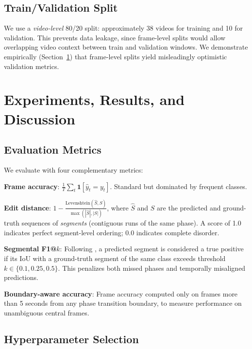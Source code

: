 \documentclass[10pt,twocolumn]{article}
\begin{document}
\subsection{Train/Validation Split}

We use a \emph{video-level} 80/20 split: approximately 38 videos for training and 10 for validation. This prevents data leakage, since frame-level splits would allow overlapping video context between train and validation windows. We demonstrate empirically (Section~\ref{sec:experiments}) that frame-level splits yield misleadingly optimistic validation metrics.

\section{Experiments, Results, and Discussion}
\label{sec:experiments}

\subsection{Evaluation Metrics}

We evaluate with four complementary metrics:

\textbf{Frame accuracy}: $\frac{1}{T}\sum_t \mathbf{1}[\hat{y}_t = y_t]$. Standard but dominated by frequent classes.

\textbf{Edit distance}: $1 - \frac{\text{Levenshtein}(\hat{S}, S)}{\max(|\hat{S}|, |S|)}$, where $\hat{S}$ and $S$ are the predicted and ground-truth sequences of \emph{segments} (contiguous runs of the same phase). A score of 1.0 indicates perfect segment-level ordering; 0.0 indicates complete disorder.

\textbf{Segmental F1@$k$}: Following \cite{farha2019mstcn}, a predicted segment is considered a true positive if its IoU with a ground-truth segment of the same class exceeds threshold $k \in \{0.1, 0.25, 0.5\}$. This penalizes both missed phases and temporally misaligned predictions.

\textbf{Boundary-aware accuracy}: Frame accuracy computed only on frames more than 5 seconds from any phase transition boundary, to measure performance on unambiguous central frames.

\subsection{Hyperparameter Selection}
\end{document}
